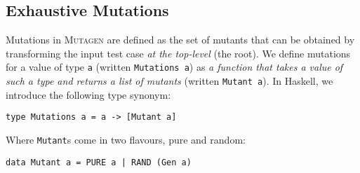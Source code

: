 \documentclass[sigconf, anonymous, review]{acmart}
\newcommand{\fuzzchick}{\textit{FuzzChick}\xspace}
\newcommand{\mutagen}{\textsc{Mutagen}\xspace}
\begin{document}



\subsection{Exhaustive Mutations}


Mutations in \mutagen are defined as the set of mutants that can be obtained by
transforming the input test case \emph{at the top-level} (the root).
%
We define mutations for a value of type \texttt{a} (written \texttt{Mutations
  a}) as \emph{a function that takes a value of such a type and returns a list of
mutants} (written \texttt{Mutant a}).
%
In Haskell, we introduce the following type synonym:
%
\begin{verbatim}
type Mutations a = a -> [Mutant a]
\end{verbatim}
%
\noindent Where \texttt{Mutant}s come in two flavours, pure and random:

\begin{verbatim}
data Mutant a = PURE a | RAND (Gen a)
\end{verbatim}
\end{document}
